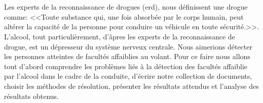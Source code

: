  \setcounter{page}{1}
\section*{ }
\label{sec:intro}
Les experts de la reconnaissance de drogues (\acrshort{erd}), nous définissent une drogue comme: <<Toute substance qui, une fois absorbée par le corps humain, peut altérer la capacité de la personne pour conduire un véhicule en toute sécurité.>>\cite{dre:administrator2}. L'alcool, tout particulièrement, d’âpres les experts de la reconnaissance de drogue, est un dépresseur du système nerveux centrale. Nous aimerions détecter les personnes atteintes de facultés affaiblies au volant. Pour ce faire nous allons tout d'abord comprendre les problèmes liés à la détection des facultés affaiblie par l'alcool dans le cadre de la conduite, d'écrire notre collection de documents, choisir les méthodes de résolution, présenter les résultats attendus et	l'analyse des résultats obtenus.      
